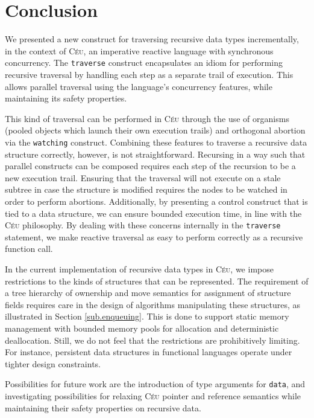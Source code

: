 \documentclass{sig-alternate}
\newcommand{\CEU}{\textsc{C\'{e}u}\xspace}
\newcommand{\code}[1] {{\small{\texttt{#1}}}}
\begin{document}
\section{Conclusion}

We presented a new construct for traversing recursive data types
incrementally, in the context of \CEU, an imperative reactive language with
synchronous concurrency. The \code{traverse} construct encapsulates an idiom
for performing recursive traversal by handling each step as a separate trail
of execution. This allows parallel traversal using the language's concurrency
features, while maintaining its safety properties.

This kind of traversal can be performed in \CEU through the use of organisms
(pooled objects which launch their own execution trails) and orthogonal
abortion via the \code{watching} construct. Combining these features to
traverse a recursive data structure correctly, however, is not straightforward.
Recursing in a way such that parallel constructs can be composed requires each
step of the recursion to be a new execution trail. Ensuring that the traversal
will not execute on a stale subtree in case the structure is modified requires
the nodes to be watched in order to perform abortions. Additionally, by
presenting a control construct that is tied to a data structure, we can ensure
bounded execution time, in line with the \CEU philosophy. By dealing with these
concerns internally in the \code{traverse} statement, we make reactive
traversal as easy to perform correctly as a recursive function call.

In the current implementation of recursive data types in \CEU, we impose
restrictions to the kinds of structures that can be represented. The
requirement of a tree hierarchy of ownership and move semantics for assignment
of structure fields requires care in the design of algorithms
manipulating these structures, as illustrated in Section \ref{sub.enqueuing}.
This is done to support static memory management with bounded memory pools for
allocation and deterministic deallocation. Still, we do not feel that the
restrictions are prohibitively limiting. For instance, persistent data
structures in functional languages \cite{TODO} operate under tighter design constraints.

Possibilities for future work are the introduction of type arguments for \code{data},
and investigating possibilities for relaxing \CEU pointer and
reference semantics while maintaining their safety properties on recursive data.



\balancecolumns
\end{document}
